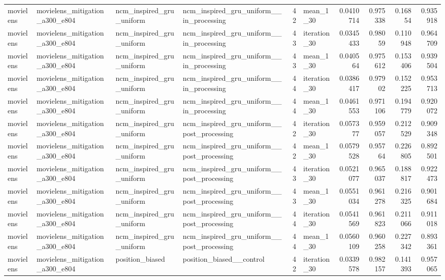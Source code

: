 \begin{table}[htbp!]
\begin{tabular}{llllrlrrrr}
movielens & movielens\_mitigation\_a300\_e804 & ncm\_inspired\_gru\_uniform & ncm\_inspired\_gru\_uniform\_\_in\_processing & 42 & mean\_1\_30 & 0.0410714 & 0.975338 & 0.16854 & 0.935918 \\
movielens & movielens\_mitigation\_a300\_e804 & ncm\_inspired\_gru\_uniform & ncm\_inspired\_gru\_uniform\_\_in\_processing & 43 & iteration\_30 & 0.0345433 & 0.98059 & 0.110948 & 0.964709 \\
movielens & movielens\_mitigation\_a300\_e804 & ncm\_inspired\_gru\_uniform & ncm\_inspired\_gru\_uniform\_\_in\_processing & 43 & mean\_1\_30 & 0.040564 & 0.975612 & 0.153406 & 0.939504 \\
movielens & movielens\_mitigation\_a300\_e804 & ncm\_inspired\_gru\_uniform & ncm\_inspired\_gru\_uniform\_\_in\_processing & 44 & iteration\_30 & 0.0386417 & 0.97902 & 0.152225 & 0.953713 \\
movielens & movielens\_mitigation\_a300\_e804 & ncm\_inspired\_gru\_uniform & ncm\_inspired\_gru\_uniform\_\_in\_processing & 44 & mean\_1\_30 & 0.0461553 & 0.971106 & 0.194779 & 0.920072 \\
movielens & movielens\_mitigation\_a300\_e804 & ncm\_inspired\_gru\_uniform & ncm\_inspired\_gru\_uniform\_\_post\_processing & 42 & iteration\_30 & 0.057377 & 0.959057 & 0.212529 & 0.909348 \\
movielens & movielens\_mitigation\_a300\_e804 & ncm\_inspired\_gru\_uniform & ncm\_inspired\_gru\_uniform\_\_post\_processing & 42 & mean\_1\_30 & 0.0579528 & 0.95764 & 0.226805 & 0.892501 \\
movielens & movielens\_mitigation\_a300\_e804 & ncm\_inspired\_gru\_uniform & ncm\_inspired\_gru\_uniform\_\_post\_processing & 43 & iteration\_30 & 0.0521077 & 0.965037 & 0.188817 & 0.922473 \\
movielens & movielens\_mitigation\_a300\_e804 & ncm\_inspired\_gru\_uniform & ncm\_inspired\_gru\_uniform\_\_post\_processing & 43 & mean\_1\_30 & 0.0551034 & 0.961278 & 0.216325 & 0.901684 \\
movielens & movielens\_mitigation\_a300\_e804 & ncm\_inspired\_gru\_uniform & ncm\_inspired\_gru\_uniform\_\_post\_processing & 44 & iteration\_30 & 0.0541569 & 0.961823 & 0.211066 & 0.911018 \\
movielens & movielens\_mitigation\_a300\_e804 & ncm\_inspired\_gru\_uniform & ncm\_inspired\_gru\_uniform\_\_post\_processing & 44 & mean\_1\_30 & 0.0560109 & 0.960258 & 0.227342 & 0.893361 \\
movielens & movielens\_mitigation\_a300\_e804 & position\_biased & position\_biased\_\_control & 42 & iteration\_30 & 0.0339578 & 0.982157 & 0.141393 & 0.957065 \\

\end{tabular}
\end{table}
